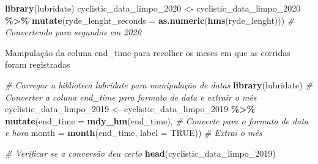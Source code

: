 \documentclass[
]{article}
\newenvironment{Shaded}{\begin{snugshade}}{\end{snugshade}}
\newcommand{\AttributeTok}[1]{\textcolor[rgb]{0.13,0.29,0.53}{#1}}
\newcommand{\CommentTok}[1]{\textcolor[rgb]{0.56,0.35,0.01}{\textit{#1}}}
\newcommand{\ConstantTok}[1]{\textcolor[rgb]{0.56,0.35,0.01}{#1}}
\newcommand{\FunctionTok}[1]{\textcolor[rgb]{0.13,0.29,0.53}{\textbf{#1}}}
\newcommand{\NormalTok}[1]{#1}
\newcommand{\OtherTok}[1]{\textcolor[rgb]{0.56,0.35,0.01}{#1}}
\newcommand{\SpecialCharTok}[1]{\textcolor[rgb]{0.81,0.36,0.00}{\textbf{#1}}}
\begin{document}
\begin{Shaded}
\begin{Highlighting}[]
\FunctionTok{library}\NormalTok{(lubridate)}
\NormalTok{cyclistic\_data\_limpo\_2020 }\OtherTok{\textless{}{-}}\NormalTok{ cyclistic\_data\_limpo\_2020 }\SpecialCharTok{\%\textgreater{}\%}
  \FunctionTok{mutate}\NormalTok{(}\AttributeTok{ryde\_lenght\_seconds =} \FunctionTok{as.numeric}\NormalTok{(}\FunctionTok{hms}\NormalTok{(ryde\_lenght)))  }\CommentTok{\# Convertendo para segundos em 2020}
\end{Highlighting}
\end{Shaded}

Manipulação da coluna end\_time para recolher os meses em que as
corridas foram registradas

\begin{Shaded}
\begin{Highlighting}[]
\CommentTok{\# Carregar a biblioteca lubridate para manipulação de datas}
\FunctionTok{library}\NormalTok{(lubridate)}
\CommentTok{\# Converter a coluna end\_time para formato de data e extrair o mês}
\NormalTok{cyclistic\_data\_limpo\_2019 }\OtherTok{\textless{}{-}}\NormalTok{ cyclistic\_data\_limpo\_2019 }\SpecialCharTok{\%\textgreater{}\%}
  \FunctionTok{mutate}\NormalTok{(}\AttributeTok{end\_time =} \FunctionTok{mdy\_hm}\NormalTok{(end\_time),  }\CommentTok{\# Converte para o formato de data e hora}
         \AttributeTok{month =} \FunctionTok{month}\NormalTok{(end\_time, }\AttributeTok{label =} \ConstantTok{TRUE}\NormalTok{))  }\CommentTok{\# Extrai o mês}

\CommentTok{\# Verificar se a conversão deu certo}
\FunctionTok{head}\NormalTok{(cyclistic\_data\_limpo\_2019)}
\end{Highlighting}
\end{Shaded}
\end{document}
